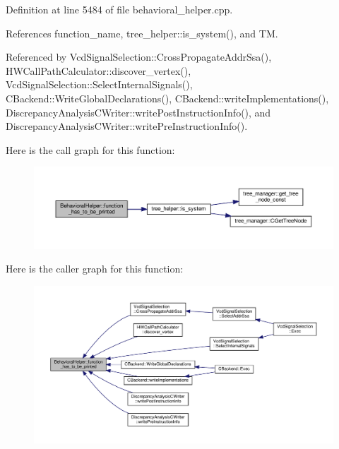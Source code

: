 Definition at line 5484 of file behavioral\+\_\+helper.\+cpp.



References function\+\_\+name, tree\+\_\+helper\+::is\+\_\+system(), and TM.



Referenced by Vcd\+Signal\+Selection\+::\+Cross\+Propagate\+Addr\+Ssa(), H\+W\+Call\+Path\+Calculator\+::discover\+\_\+vertex(), Vcd\+Signal\+Selection\+::\+Select\+Internal\+Signals(), C\+Backend\+::\+Write\+Global\+Declarations(), C\+Backend\+::write\+Implementations(), Discrepancy\+Analysis\+C\+Writer\+::write\+Post\+Instruction\+Info(), and Discrepancy\+Analysis\+C\+Writer\+::write\+Pre\+Instruction\+Info().

Here is the call graph for this function\+:
\nopagebreak
\begin{figure}[H]
\begin{center}
\leavevmode
\includegraphics[width=350pt]{dd/db2/classBehavioralHelper_a06c2b533436efe15b08253dea9eb5222_cgraph}
\end{center}
\end{figure}
Here is the caller graph for this function\+:
\nopagebreak
\begin{figure}[H]
\begin{center}
\leavevmode
\includegraphics[width=350pt]{dd/db2/classBehavioralHelper_a06c2b533436efe15b08253dea9eb5222_icgraph}
\end{center}
\end{figure}
\mbox{\label{classBehavioralHelper_ae23d240480b0859b3bae1e63968a35d7}} 
